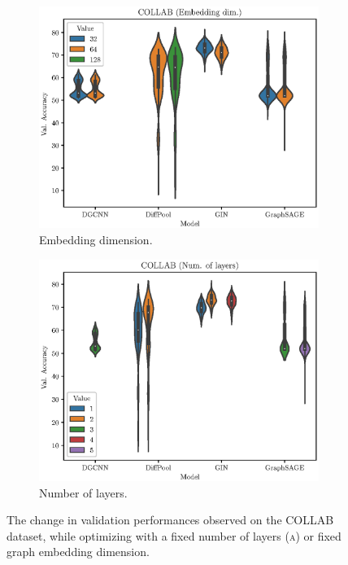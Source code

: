 \begin{figure}[h!]
    \centering
    \begin{subfigure}[b]{0.49\textwidth}
        \centering
        \includegraphics[width=\textwidth]{Figures/Chapter4/collab-embedding.eps}
        \caption{Embedding dimension.}
        \label{fig:collab-layer}
    \end{subfigure}
    \hfill
    \begin{subfigure}[b]{0.49\textwidth}
        \centering
        \includegraphics[width=\textwidth]{Figures/Chapter4/collab-layers.eps}
        \caption{Number of layers.}
        \label{fig:collab-emb}
    \end{subfigure}
       \caption{The change in validation performances observed on the COLLAB dataset, while optimizing with a fixed number of layers \textsc{(a)} or fixed graph embedding dimension.}
       \label{fig:collab-posthoc}
\end{figure}

